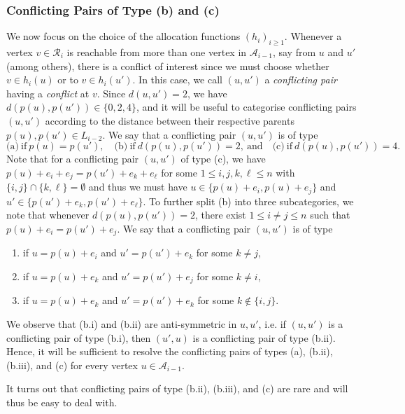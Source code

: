\documentclass[11pt]{article}
\newcommand{\A}{\mathcal{A}}
\theoremstyle{remark}
\begin{document}
\subsubsection{Conflicting Pairs of Type (b) and (c)}

We now focus on the choice of the allocation functions $(h_i)_{i\ge 1}$. Whenever a vertex $v \in \mathcal R_i$ is reachable from more than one vertex in $\A_{i-1}$, say from $u$ and $u'$ (among others), there is a conflict of interest since we must choose whether $v \in h_i(u)$ or to $v \in h_i(u')$. In this case, we call  $(u,u')$ a \emph{conflicting pair} having a \emph{conflict} at $v$. Since $d(u,u')=2$, we have $d(p(u),p(u'))\in \{0,2,4\}$, and it will be useful to categorise conflicting pairs $(u,u')$ according to the distance between their respective parents $p(u),p(u') \in L_{i-2}$. We say that a conflicting pair $(u,u')$ is of type 
\begin{equation}
    \text{(a)}\ \text{if}\ p(u)=p(u'), \quad \text{(b)}\ \text{if}\ d(p(u),p(u'))=2, \ \text{and}\quad \text{(c)}\ \text{if}\ d(p(u),p(u'))=4.
\end{equation}
Note that for a conflicting pair $(u,u')$ of type (c), we have $p(u) + e_i + e_j = p(u') + e_k + e_\ell$ for some $1\le i,j,k,\ell\le n$ with $\{i,j\} \cap \{k,\ell\} = \emptyset$ and thus we must have $u \in \{p(u)+e_i, p(u)+e_j\}$ and $u' \in \{p(u')+e_k, p(u')+e_\ell\}$.
To further split (b) into three subcategories, we note that whenever $d(p(u),p(u'))=2$, there exist $1 \le i \neq j \le n$ such that $p(u) + e_i =  p(u')+ e_j$. We say that a conflicting pair $(u,u')$ is of type 
\begin{enumerate}
    \item[(b.i)] if $u = p(u) + e_i$ and $u' = p(u') + e_k$ for some $k \neq j$,
    \item[(b.ii)] if $u = p(u) + e_k$ and $u' = p(u') + e_j$ for some $k \neq i$,
    \item[(b.iii)] if $u = p(u) + e_k$ and $u' = p(u') + e_k$ for some $k \not\in \{i,j\}$.
\end{enumerate}
We observe that (b.i) and (b.ii) are anti-symmetric in $u,u'$, i.e. if $(u,u')$ is a conflicting pair of type (b.i), then $(u',u)$ is a conflicting pair of type (b.ii). Hence, it will be sufficient to resolve  the conflicting pairs of types (a), (b.ii), (b.iii), and (c) for every vertex $u \in \A_{i-1}$. 

It turns out that conflicting pairs of type (b.ii), (b.iii), and (c) are rare and will thus be easy to deal with.\\
\end{document}
